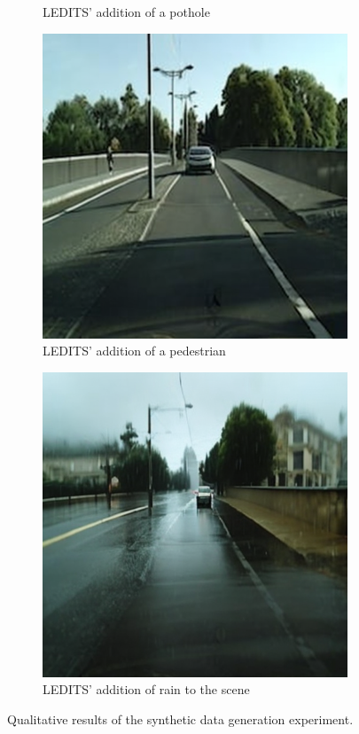 \documentclass[letterpaper, 10 pt, conference]{ieeeconf}  %
\begin{document}
\begin{figure}
\begin{subfigure}{0.20\textwidth}
    \caption{LEDITS' addition of a pothole}
    \label{ledits:pothole}
\end{subfigure}
\hfill        
\begin{subfigure}{0.20\textwidth}
    \includegraphics[width=\textwidth]{pedestrian_addition.png}
    \caption{LEDITS' addition of a pedestrian}
    \label{ledits:pedestrian}
\end{subfigure}
\hfill
\begin{subfigure}{0.20\textwidth}
    \includegraphics[width=\textwidth]{rain_addition.png}
    \caption{LEDITS' addition of rain to the scene}
    \label{ledits:rain}
\end{subfigure}
\hfill        
\caption{Qualitative results of the synthetic data generation experiment.}
\label{ledits:experiment}
\end{figure}
\end{document}
